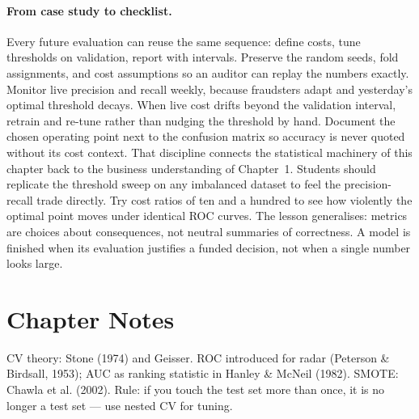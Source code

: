 \paragraph{From case study to checklist.} Every future evaluation can reuse the same sequence: define costs, tune thresholds on validation, report with intervals.
Preserve the random seeds, fold assignments, and cost assumptions so an auditor can replay the numbers exactly.
Monitor live precision and recall weekly, because fraudsters adapt and yesterday's optimal threshold decays.
When live cost drifts beyond the validation interval, retrain and re-tune rather than nudging the threshold by hand.
Document the chosen operating point next to the confusion matrix so accuracy is never quoted without its cost context.
That discipline connects the statistical machinery of this chapter back to the business understanding of Chapter~1.
Students should replicate the threshold sweep on any imbalanced dataset to feel the precision-recall trade directly.
Try cost ratios of ten and a hundred to see how violently the optimal point moves under identical ROC curves.
The lesson generalises: metrics are choices about consequences, not neutral summaries of correctness.
A model is finished when its evaluation justifies a funded decision, not when a single number looks large.

\section{Chapter Notes}
CV theory: Stone (1974) and Geisser. ROC introduced for radar (Peterson \& Birdsall, 1953); AUC as ranking statistic in Hanley \& McNeil (1982). SMOTE: Chawla et al. (2002). Rule: if you touch the test set more than once, it is no longer a test set --- use nested CV for tuning.

